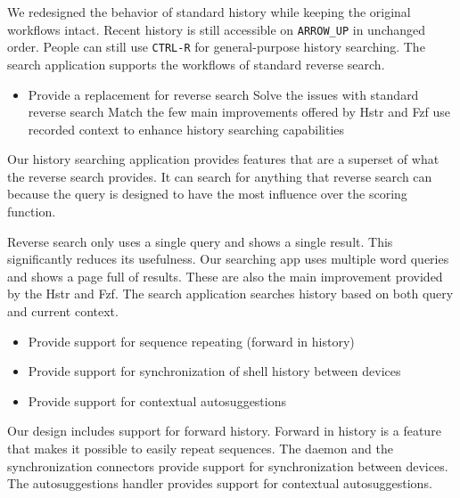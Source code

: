 We redesigned the behavior of standard history while keeping the original workflows intact. Recent history is still accessible on \verb|ARROW_UP| in unchanged order. People can still use \verb|CTRL-R| for general-purpose history searching. 
The search application supports the workflows of standard reverse search.

\begin{itemize}
\item Provide a replacement for reverse search
\subitem Solve the issues with standard reverse search
\subitem Match the few main improvements offered by Hstr and Fzf
\subitem use recorded context to enhance history searching capabilities
\end{itemize}

Our history searching application provides features that are a superset of what the reverse search provides. It can search for anything that reverse search can because the query is designed to have the most influence over the scoring function.

Reverse search only uses a single query and shows a single result. This significantly reduces its usefulness. Our searching app uses multiple word queries and shows a page full of results. These are also the main improvement provided by the Hstr and Fzf.
The search application searches history based on both query and current context.

\begin{itemize}
\item Provide support for sequence repeating (forward in history)
\item Provide support for synchronization of shell history between devices
\item Provide support for contextual autosuggestions
\end{itemize}

Our design includes support for forward history. Forward in history is a feature that makes it possible to easily repeat sequences. 
The daemon and the synchronization connectors provide support for synchronization between devices. The autosuggestions handler provides support for contextual autosuggestions.

